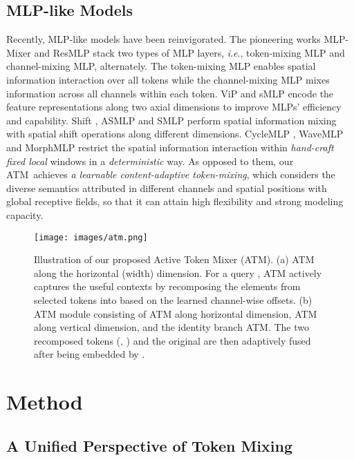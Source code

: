 \documentclass[letterpaper]{article} \usepackage{aaai23v}  \usepackage{times}  \usepackage{helvet}  \usepackage{courier}  \usepackage[hyphens]{url}  \usepackage{graphicx} \urlstyle{rm} \def\UrlFont{\rm}  \usepackage{caption} \frenchspacing  \setlength{\pdfpagewidth}{8.5in}  \setlength{\pdfpageheight}{11in}  \usepackage{algorithm}
\newcommand{\ieno}{\textit{i}.\textit{e}.}
\newcommand{\ourop}{{ATM}}
\begin{document}
\subsection{MLP-like Models}

Recently, MLP-like models have been reinvigorated. The pioneering works MLP-Mixer \cite{tolstikhin2021mlpmixer} and ResMLP \cite{touvron2021resmlp} stack two types of MLP layers, \ieno, token-mixing MLP and channel-mixing MLP, alternately. The token-mixing MLP enables spatial information interaction over all tokens while the channel-mixing MLP mixes information across all channels within each token.
ViP \cite{hou2021visionvip} and sMLP \cite{tang2021sparsesMLP} encode the feature representations along two axial dimensions to improve MLPs' efficiency and capability. Shift \cite{wang2022shift}, ASMLP \cite{lian2021asmlp} and SMLP \cite{yu2022s2MLP} perform spatial information mixing with spatial shift operations along different dimensions. CycleMLP \cite{chen2022cyclemlp}, WaveMLP \cite{tang2021imagewavemlp} and MorphMLP \cite{zhang2021morphmlp} restrict the spatial information interaction within \textit{hand-craft fixed local} windows in a \textit{deterministic} way. As opposed to them, our \ourop~achieves \textit{a learnable content-adaptive token-mixing}, which considers the diverse semantics attributed in different channels and spatial positions with global receptive fields, so that it can attain high flexibility and strong modeling capacity.



\begin{figure*}[t]
	\centering
	\texttt{[image: images/atm.png]}
    \caption{Illustration of our proposed Active Token Mixer (ATM). 
    (a) ATM along the horizontal (width) dimension.
    For a query , ATM actively captures the useful contexts by recomposing the elements from selected tokens into  based on the learned channel-wise offsets.
    (b) ATM module consisting of ATM along horizontal dimension, ATM along vertical dimension, and the identity branch ATM. The two recomposed tokens (, ) and the original   are then adaptively fused after being embedded by . 
    }	
    \label{fig: atm_module}
\end{figure*}
\section{Method}

\subsection{A Unified Perspective of Token Mixing}
\label{sec: UnifiedPerspective}
\end{document}

